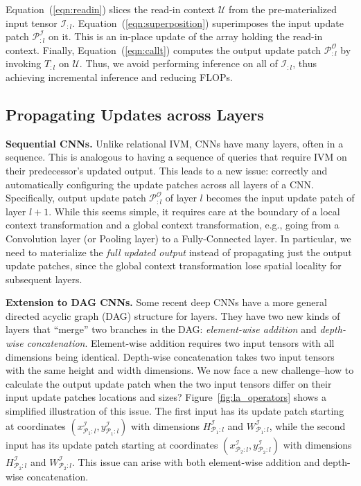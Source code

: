 Equation~(\ref{eqn:readin}) slices the read-in context $\mathcal{U}$ from the pre-materialized input tensor $\mathcal{I}_{:l}$. Equation~(\ref{eqn:superposition}) superimposes the input update patch $\mathcal{P}^\mathcal{I}_{:l}$ on it. This is an in-place update of the array holding the read-in context. Finally, Equation~(\ref{eqn:callt}) computes the output update patch $\mathcal{P}^{\mathcal{O}}_{:l}$ by invoking $T_{:l}$ on $\mathcal{U}$. Thus, we avoid performing inference on all of $\mathcal{I}_{:l}$, thus achieving incremental inference and reducing FLOPs.


\subsection{Propagating Updates across Layers}

\vspace{2mm}
\noindent \textbf{Sequential CNNs.} Unlike relational IVM, CNNs have many layers, often in a sequence. This is analogous to having a sequence of queries that require IVM on their predecessor's updated output. This leads to a new issue: correctly and automatically configuring the update patches across all layers of a CNN. Specifically, output update patch $\mathcal{P}^{\mathcal{O}}_{:l}$ of layer $l$ becomes the input update patch of layer $l+1$. While this seems simple, it requires care at the boundary of a local context transformation and a global context transformation, e.g., going from a Convolution layer (or Pooling layer) to a Fully-Connected layer. In particular, we need to materialize the \textit{full updated output} instead of propagating just the output update patches, since the global context transformation lose spatial locality for subsequent layers.

\vspace{2mm}
\noindent \textbf{Extension to DAG CNNs.} Some recent deep CNNs have a more general directed acyclic graph (DAG) structure for layers. They have two new kinds of layers that ``merge'' two branches in the DAG: \textit{element-wise addition} and \textit{depth-wise concatenation}. Element-wise addition requires two input tensors with all dimensions being identical. Depth-wise concatenation takes two input tensors with the same height and width dimensions. We now face a new challenge--how to calculate the output update patch when the two input tensors differ on their input update patches locations and sizes? Figure~\ref{fig:la_operators} shows a simplified illustration of this issue. The first input has its update patch starting at coordinates $(x^\mathcal{I}_{\mathcal{P}_1:l},y^\mathcal{I}_{\mathcal{P}_1:l})$ with dimensions $H^\mathcal{I}_{\mathcal{P}_1:l}$ and $W^\mathcal{I}_{\mathcal{P}_1:l}$, while the second input has its update patch starting at coordinates $(x^\mathcal{I}_{\mathcal{P}_2:l},y^\mathcal{I}_{\mathcal{P}_2:l})$ with dimensions $H^\mathcal{I}_{\mathcal{P}_2:l}$ and $W^\mathcal{I}_{\mathcal{P}_2:l}$. This issue can arise with both element-wise addition and depth-wise concatenation. 

